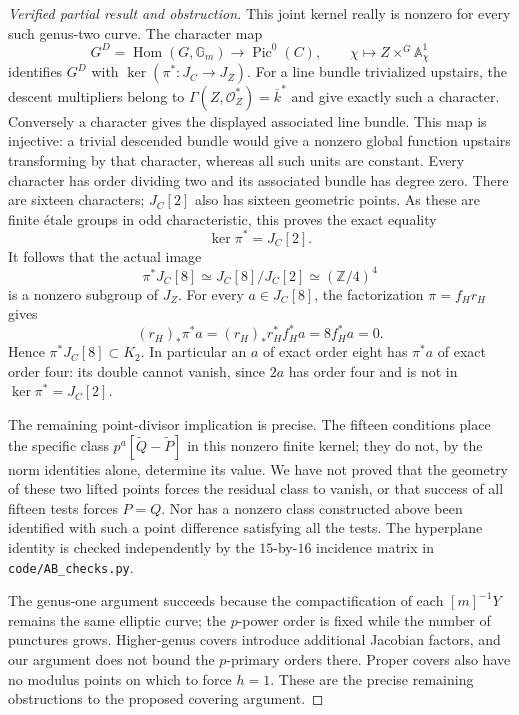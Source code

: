 \begin{proof}[Verified partial result and obstruction]
This joint kernel really is nonzero for every such genus-two
curve. The character map
\[
 G^D=\operatorname{Hom}(G,\mathbb G_m)
 \longrightarrow\operatorname{Pic}^0(C),\qquad
 \chi\longmapsto Z\times^G\mathbb A^1_\chi
\]
identifies $G^D$ with $\ker(\pi^*:J_C\to J_Z)$.
For a line bundle trivialized upstairs, the descent multipliers
belong to $\Gamma(Z,\mathcal O_Z^*)=\overline k^*$ and
give exactly such a character. Conversely a character gives the
displayed associated line bundle. This map is injective: a
trivial descended bundle would give a nonzero global function
upstairs transforming by that character, whereas all such units
are constant. Every character has order dividing two and its
associated bundle has degree zero. There are sixteen characters;
$J_C[2]$ also has sixteen geometric points. As these are finite
\'etale groups in odd characteristic, this proves the exact equality
\[
                  \ker\pi^*=J_C[2].
\]
It follows that the actual image
\[
 \pi^*J_C[8]\simeq J_C[8]/J_C[2]
                   \simeq(\mathbb Z/4)^4
\]
is a nonzero subgroup of $J_Z$. For every $a\in J_C[8]$,
the factorization $\pi=f_Hr_H$ gives
\[
 (r_H)_*\pi^*a
   =(r_H)_*r_H^*f_H^*a=8f_H^*a=0.
\]
Hence $\pi^*J_C[8]\subset K_2$. In particular an $a$ of
exact order eight has $\pi^*a$ of exact order four: its double
cannot vanish, since $2a$ has order four and is not in
$\ker\pi^*=J_C[2]$.

The remaining point-divisor implication is precise. The fifteen
conditions place the specific class
$p^a[\widetilde Q-\widetilde P]$ in this nonzero finite kernel;
they do not, by the norm identities alone, determine its value.
We have not proved that the geometry of these two lifted points
forces the residual class to vanish, or that success of all fifteen
tests forces $P=Q$. Nor has a nonzero class constructed above been
identified with such a point difference satisfying all the tests.
The hyperplane identity is checked independently by the
$15$-by-$16$ incidence matrix in \texttt{code/AB\_checks.py}.

The genus-one argument succeeds because the compactification of each
$[m]^{-1}Y$ remains the same elliptic curve; the $p$-power order is
fixed while the number of punctures grows. Higher-genus covers
introduce additional Jacobian factors, and our argument does not
bound the $p$-primary orders there. Proper covers also have no modulus
points on which to force $h=1$. These are the precise remaining
obstructions to the proposed covering argument.
\end{proof}

